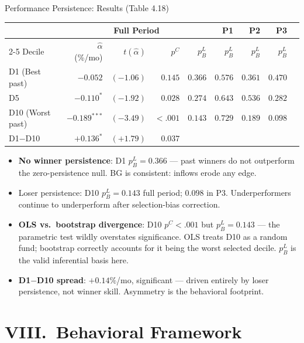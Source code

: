 \documentclass[10pt, aspectratio=169]{beamer}
\begin{document}
\begin{frame}{Performance Persistence: Results (Table 4.18)}
  \scriptsize
  \begin{tabular}{@{}lrrrrrrrr@{}}
    \toprule
    & \multicolumn{4}{c}{Full Period} & P1 & P2 & P3 \\
    \cmidrule(lr){2-5}
    Decile & $\hat{\alpha}$ (\%/mo) & $t(\hat{\alpha})$ & $p^C$ & $p^L_B$ & $p^L_B$ & $p^L_B$ & $p^L_B$ \\
    \midrule
    D1 (Best past)   & $-0.052$        & $(-1.06)$ & $0.145$ & $0.366$ & $0.576$ & $0.361$ & $0.470$ \\
    D5               & $-0.110^{*}$    & $(-1.92)$ & $0.028$ & $0.274$ & $0.643$ & $0.536$ & $0.282$ \\
    D10 (Worst past) & $-0.189^{***}$  & $(-3.49)$ & $<.001$ & $\mathbf{0.143}$ & $0.729$ & $0.189$ & $\mathbf{0.098}$ \\
    \midrule
    D1$-$D10         & $+0.136^{*}$    & $(+1.79)$ & $0.037$ & & & & \\
    \bottomrule
  \end{tabular}
  \vspace{4pt}
  \begin{itemize}\itemsep2pt
    \item \textbf{No winner persistence}: D1 $p^L_B = 0.366$ — past winners do not
          outperform the zero-persistence null. BG is consistent: inflows erode any edge.
    \item \alert{Loser persistence}: D10 $p^L_B = 0.143$ full period; $0.098$ in P3.
          Underperformers continue to underperform after selection-bias correction.
    \item \textbf{OLS vs.\ bootstrap divergence}: D10 $p^C < .001$ but $p^L_B = 0.143$ —
          the parametric test wildly overstates significance. OLS treats D10 as a
          random fund; bootstrap correctly accounts for it being the worst selected decile.
          $p^L_B$ is the valid inferential basis here.
    \item \textbf{D1$-$D10 spread}: $+0.14\%$/mo, significant — driven entirely
          by loser persistence, not winner skill. Asymmetry is the behavioral footprint.
  \end{itemize}
\end{frame}

\section{VIII.\ Behavioral Framework}
\end{document}
